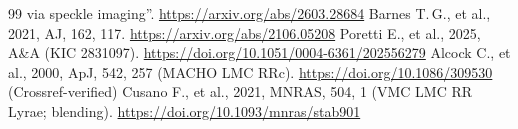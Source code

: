 \documentclass[11pt]{article}
\begin{document}
\begin{thebibliography}{99}
via speckle imaging''. \url{https://arxiv.org/abs/2603.28684}
 Barnes T.\,G., et al., 2021, AJ, 162, 117. \url{https://arxiv.org/abs/2106.05208}
 Poretti E., et al., 2025, A\&A (KIC 2831097). \url{https://doi.org/10.1051/0004-6361/202556279}
 Alcock C., et al., 2000, ApJ, 542, 257 (MACHO LMC RRc). \url{https://doi.org/10.1086/309530} (Crossref-verified)
 Cusano F., et al., 2021, MNRAS, 504, 1 (VMC LMC RR Lyrae; blending).
\url{https://doi.org/10.1093/mnras/stab901}
\end{thebibliography}
\end{document}
